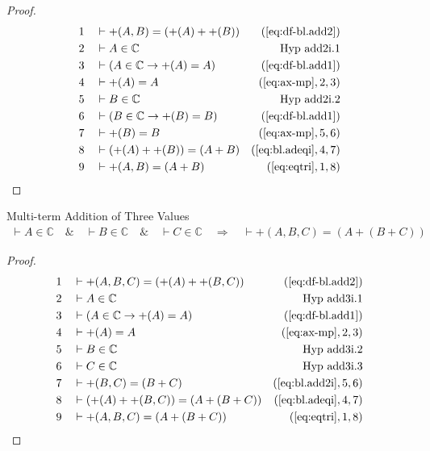 \begin{proof}
\begin{align}
  1 &&  & \vdash +( A , B ) = ( +( A ) + +( B )
     )&(\mbox{\ref{eq:df-bl.add2}})\notag
  \\ 2 &&  & \vdash A \in \mathbb{C}&\text{Hyp~add2i.1}\notag%
  \\ 3 &&  & \vdash ( A \in \mathbb{C} \rightarrow +( A ) = A
     )&(\mbox{\ref{eq:df-bl.add1}})\notag
  \\ 4 &&  & \vdash +( A ) = A&(\mbox{\ref{eq:ax-mp}},2,3)\notag
  \\ 5 &&  & \vdash B \in \mathbb{C}&\text{Hyp~add2i.2}\notag%
  \\ 6 &&  & \vdash ( B \in \mathbb{C} \rightarrow +( B ) = B
     )&(\mbox{\ref{eq:df-bl.add1}})\notag
  \\ 7 &&  & \vdash +( B ) = B&(\mbox{\ref{eq:ax-mp}},5,6)\notag
  \\ 8 &&  & \vdash ( +( A ) + +( B ) ) = ( A + B
     )&(\mbox{\ref{eq:bl.adeqi}},4,7)\notag
  \\ 9 &&  & \vdash +( A , B ) = ( A + B )&(\mbox{\ref{eq:eqtri}},1,8)\notag
\end{align}
\end{proof}

\begin{lemma} {Multi-term Addition of Three Values}
\begin{align}
\vdash A \in \mathbb{C}\quad\&\quad \vdash B \in \mathbb{C}\quad\&\quad \vdash
    C \in \mathbb{C}\quad\Rightarrow\quad \vdash +( A , B , C ) = ( A + ( B + C
    ) )\label{eq:bl.add3i}\tag{bl.add3i}
\end{align}
\end{lemma}


\begin{proof}
\begin{align}
  1 &&  & \vdash +( A , B , C ) = ( +( A ) + +( B , C )
     )&(\mbox{\ref{eq:df-bl.add2}})\notag
  \\ 2 &&  & \vdash A \in \mathbb{C}&\text{Hyp~add3i.1}\notag%
  \\ 3 &&  & \vdash ( A \in \mathbb{C} \rightarrow +( A ) = A
     )&(\mbox{\ref{eq:df-bl.add1}})\notag
  \\ 4 &&  & \vdash +( A ) = A&(\mbox{\ref{eq:ax-mp}},2,3)\notag
  \\ 5 &&  & \vdash B \in \mathbb{C}&\text{Hyp~add3i.2}\notag%
  \\ 6 &&  & \vdash C \in \mathbb{C}&\text{Hyp~add3i.3}\notag%
  \\ 7 &&  & \vdash +( B , C ) = ( B + C )&(\mbox{\ref{eq:bl.add2i}},5,6)\notag
  \\ 8 &&  & \vdash ( +( A ) + +( B , C ) ) = ( A + ( B + C )
     )&(\mbox{\ref{eq:bl.adeqi}},4,7)\notag
  \\ 9 &&  & \vdash +( A , B , C ) = ( A + ( B + C )
     )&(\mbox{\ref{eq:eqtri}},1,8)\notag
\end{align}
\end{proof}

